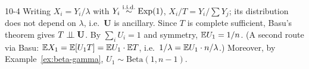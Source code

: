 \begin{solution}{10-4}
Writing $X_i=Y_i/\lambda$ with $Y_i\overset{\text{i.i.d.}}{\sim}\text{Exp}(1)$, $X_i/T=Y_i/\sum Y_j$; its distribution does not depend on $\lambda$, i.e.\ $\mathbf U$ is ancillary. Since $T$ is complete sufficient, Basu's theorem gives $T\perp\!\!\!\perp\mathbf U$. By $\sum_iU_i=1$ and symmetry, $\mathbb{E} U_1=1/n$. (A second route via Basu: $\mathbb{E} X_1=\mathbb{E}[U_1T]=\mathbb{E} U_1\cdot\mathbb{E} T$, i.e.\ $1/\lambda=\mathbb{E} U_1\cdot n/\lambda$.) Moreover, by Example~\ref{ex:beta-gamma}, $U_1\sim\text{Beta}(1,n-1)$.
\end{solution}
